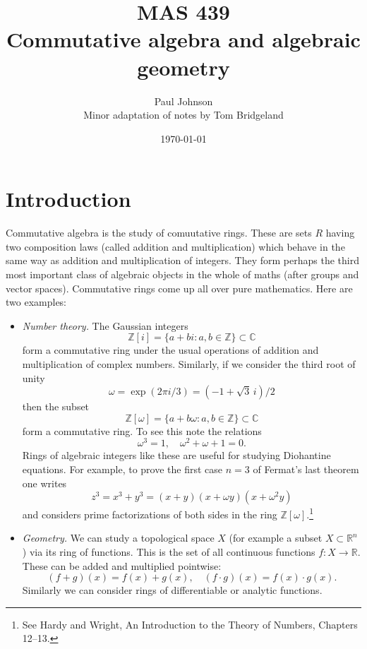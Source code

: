 \documentclass [12pt,oneside,a4paper,mathscr]{amsart}
\date{\today}
\title{MAS 439 \medskip \\ Commutative algebra and algebraic geometry}
\author{Paul Johnson \\ Minor adaptation of notes by Tom Bridgeland}
\theoremstyle{definition}
\newcommand {\C}{\mathbb C}
\newcommand{\R}{\mathbb{R}}
\newcommand{\Z}{\mathbb Z}
\begin{document}
\maketitle





\setcounter{tocdepth}{1}
\tableofcontents




\newpage


\section{Introduction}

Commutative algebra is the study of comuutative rings. These are sets $R$ having two composition laws (called addition and multiplication)
which behave in the same way as addition and multiplication of integers. They form perhaps the third most important class of algebraic objects in the whole of maths (after  groups and vector spaces). Commutative rings come up all over pure mathematics. Here are two examples:

\begin{itemize}
\item \emph {Number theory.} The Gaussian integers
\[\Z[i]=\{a+b i :a,b\in \Z\}\subset \C\]
form a commutative ring under the usual operations of addition and multiplication of complex numbers. Similarly, if we consider the third root of unity \[\omega=\exp(2\pi i/3)=(-1+\sqrt{3}\, i)/2\]
 then the subset
\[\Z[\omega]=\{a+b\omega: a,b \in \Z\}\subset \C\]
form a commutative ring. To see this note the relations
\[\omega^3=1, \quad \omega^2+ \omega+ 1=0.\]
Rings of algebraic integers like these are useful for studying Diohantine equations. For example, to prove the first case $n=3$ of Fermat's last theorem one writes
\[z^3=x^3+y^3=(x+y)(x+\omega y)(x+\omega^2 y)\]
and considers prime factorizations of both sides in the ring $\Z[\omega]$.\footnote{ See Hardy and Wright, An Introduction to the Theory of Numbers, Chapters 12--13. }
\smallskip
\item \emph{Geometry.} We can study a topological space $X$ (for example a subset $X\subset \R^n$)  via its ring of  functions. This is the set of all continuous functions $f\colon X \to \R$. These can be added and multiplied pointwise:
\[(f+g)(x)=f(x)+g(x), \quad (f\cdot g)(x)=f(x)\cdot g(x).\]
Similarly we can consider rings of differentiable or analytic functions.
\end{itemize}
\end{document}
